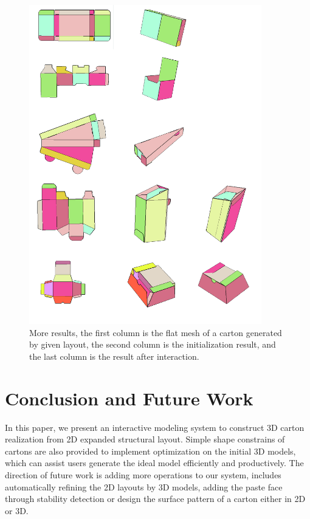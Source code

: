 \documentclass[submission]{gmp2018}
\begin{document}
\begin{figure}
	\centering
	\includegraphics[width=0.9\textwidth]{images/more.jpg}
	\caption{More results, the first column is the flat mesh of a carton generated by given layout, the second column is the initialization result, and the last column is the result after interaction.}
	\label{fig:more}
\end{figure}


\section{Conclusion and Future Work}\label{sec:conclusion}
In this paper, we present an interactive modeling system to construct 3D carton realization from 2D expanded structural layout. Simple shape constrains of cartons are also provided to implement optimization on the initial 3D models, which can assist users generate the ideal model efficiently and productively. The direction of future work is adding more operations to our system, includes automatically refining the 2D layouts by 3D models, adding the paste face through stability detection or design the surface pattern of a carton either in 2D or 3D. 
\end{document}
